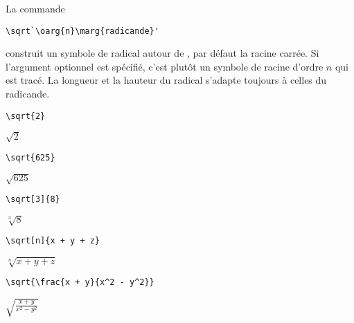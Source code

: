 La commande
\begin{lstlisting}
\sqrt`\oarg{n}\marg{radicande}'
\end{lstlisting}
construit un symbole de radical autour de , par défaut
la racine carrée. Si l'argument optionnel  est spécifié, c'est
plutôt un symbole de racine d'ordre $n$ qui est tracé. La longueur et
la hauteur du radical s'adapte toujours à celles du radicande.
\begin{trivlist}
\item
  \begin{texinput}{0.2\linewidth}
\begin{lstlisting}
\sqrt{2}
\end{lstlisting}
  \end{texinput}
  \quad
  \begin{texoutput}{0.1\linewidth}
    $\sqrt{2}$
  \end{texoutput}
  \hfill
  \begin{texinput}{0.2\linewidth}
\begin{lstlisting}
\sqrt{625}
\end{lstlisting}
  \end{texinput}
  \quad
  \begin{texoutput}{0.1\linewidth}
    $\sqrt{625}$
  \end{texoutput}
  \hfill
  \begin{texinput}{0.2\linewidth}
\begin{lstlisting}
\sqrt[3]{8}
\end{lstlisting}
  \end{texinput}
  \quad
  \begin{texoutput}{0.1\linewidth}
    $\sqrt[3]{8}$
  \end{texoutput}
\item
  \begin{texinput}{0.48\linewidth}
\begin{lstlisting}
\sqrt[n]{x + y + z}
\end{lstlisting}
  \end{texinput}
  \hfill
  \begin{texoutput}{0.48\linewidth}
    $\sqrt[n]{x + y + z}$
  \end{texoutput}
\item
  \begin{texinput}{0.48\linewidth}
\begin{lstlisting}
\sqrt{\frac{x + y}{x^2 - y^2}}
\end{lstlisting}
  \end{texinput}
  \hfill
  \begin{texoutput}[c]{0.48\linewidth}
    $\displaystyle \sqrt{\frac{x + y}{x^2 - y^2}}$
  \end{texoutput}
\end{trivlist}


